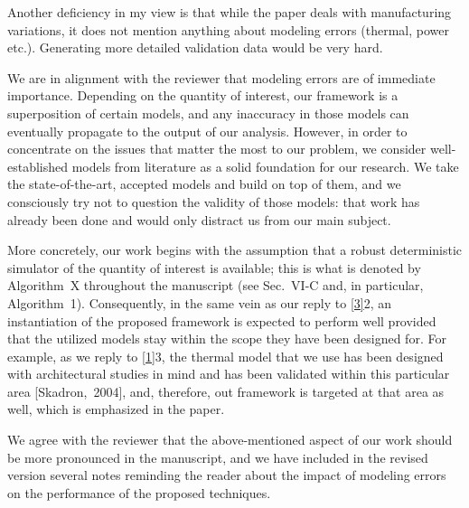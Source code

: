 \begin{reviewer}
Another deficiency in my view is that while the paper deals with manufacturing
variations, it does not mention anything about modeling errors (thermal, power
etc.). Generating more detailed validation data would be very hard.
\end{reviewer}

\begin{authors}
We are in alignment with the reviewer that modeling errors are of immediate
importance. Depending on the quantity of interest, our framework is a
superposition of certain models, and any inaccuracy in those models can
eventually propagate to the output of our analysis. However, in order to
concentrate on the issues that matter the most to our problem, we consider
well-established models from literature as a solid foundation for our research.
We take the state-of-the-art, accepted models and build on top of them, and we
consciously try not to question the validity of those models: that work has
already been done and would only distract us from our main subject.

More concretely, our work begins with the assumption that a robust deterministic
simulator of the quantity of interest is available; this is what is denoted by
Algorithm~X throughout the manuscript (see Sec.~VI-C and, in particular,
Algorithm~1). Consequently, in the same vein as our reply to \cref{3}{2}, an
instantiation of the proposed framework is expected to perform well provided
that the utilized models stay within the scope they have been designed for. For
example, as we reply to \cref{1}{3}, the thermal model that we use has been
designed with architectural studies in mind and has been validated within this
particular area [Skadron,~2004], and, therefore, out framework is targeted at
that area as well, which is emphasized in the paper.

We agree with the reviewer that the above-mentioned aspect of our work should be
more pronounced in the manuscript, and we have included in the revised version
several notes reminding the reader about the impact of modeling errors on the
performance of the proposed techniques.

\begin{actions}
\end{actions}
\end{authors}

